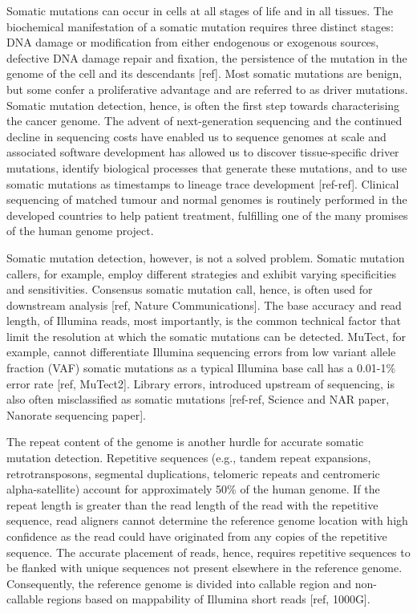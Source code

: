 Somatic mutations can occur in cells at all stages of life and in all tissues. The biochemical manifestation of a somatic mutation requires three distinct stages: DNA damage or modification from either endogenous or exogenous sources, defective DNA damage repair and fixation, the persistence of the mutation in the genome of the cell and its descendants [ref]. Most somatic mutations are benign, but some confer a proliferative advantage and are referred to as driver mutations. Somatic mutation detection, hence, is often the first step towards characterising the cancer genome. The advent of next-generation sequencing and the continued decline in sequencing costs have enabled us to sequence genomes at scale and associated software development has allowed us to discover tissue-specific driver mutations, identify biological processes that generate these mutations, and to use somatic mutations as timestamps to lineage trace development [ref-ref]. Clinical sequencing of matched tumour and normal genomes is routinely performed in the developed countries to help patient treatment, fulfilling one of the many promises of the human genome project. 

Somatic mutation detection, however, is not a solved problem. Somatic mutation callers, for example, employ different strategies and exhibit varying specificities and sensitivities. Consensus somatic mutation call, hence, is often used for downstream analysis [ref, Nature Communications]. The base accuracy and read length, of Illumina reads, most importantly, is the common technical factor that limit the resolution at which the somatic mutations can be detected. MuTect, for example, cannot differentiate Illumina sequencing errors from low variant allele fraction (VAF) somatic mutations as a typical Illumina base call has a 0.01-1\% error rate [ref, MuTect2]. Library errors, introduced upstream of sequencing, is also often misclassified as somatic mutations [ref-ref, Science and NAR paper, Nanorate sequencing paper]. 

The repeat content of the genome is another hurdle for accurate somatic mutation detection. Repetitive sequences (e.g., tandem repeat expansions, retrotransposons, segmental duplications, telomeric repeats and centromeric alpha-satellite) account for approximately 50\% of the human genome. If the repeat length is greater than the read length of the read with the repetitive sequence, read aligners cannot determine the reference genome location with high confidence as the read could have originated from any copies of the repetitive sequence. The accurate placement of reads, hence, requires repetitive sequences to be flanked with unique sequences not present elsewhere in the reference genome. Consequently, the reference genome is divided into callable region and non-callable regions based on mappability of Illumina short reads [ref, 1000G]. 


